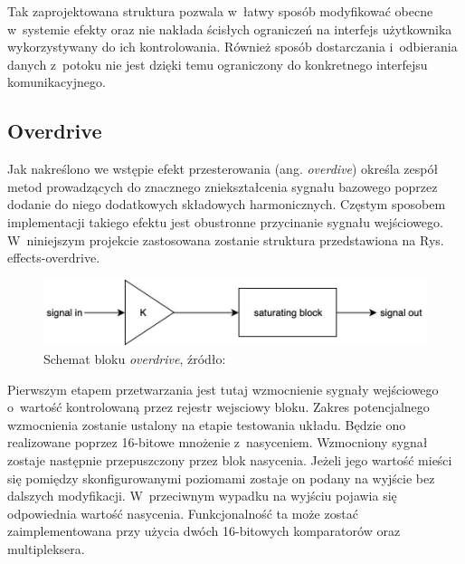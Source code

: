 Tak zaprojektowana struktura pozwala w~łatwy sposób modyfikować obecne w~systemie efekty oraz nie nakłada ścisłych ograniczeń na interfejs użytkownika wykorzystywany do ich kontrolowania. Również sposób dostarczania i~odbierania danych z~potoku nie jest dzięki temu ograniczony do konkretnego interfejsu komunikacyjnego.


\subsection{Overdrive}

Jak nakreślono we wstępie efekt przesterowania (ang. \textit{overdive}) określa zespół metod prowadzących do znacznego zniekształcenia sygnału bazowego poprzez dodanie do niego dodatkowych składowych harmonicznych. Częstym sposobem implementacji takiego efektu jest obustronne przycinanie sygnału wejściowego. W~niniejszym projekcie zastosowana zostanie struktura przedstawiona na Rys. {effects-overdrive}.

\vspace{0.5cm}
\begin{figure}[ht]
    \centering
    \includegraphics[scale=0.4]{img/overdrive.jpg}
    \captionsetup{format=plain,justification=centering}
    \caption{Schemat bloku \textit{overdrive}, źródło: \cite{fpga_pedal}}
    \label{effects-overdrive}
\end{figure}
\vspace{0.5cm}

Pierwszym etapem przetwarzania jest tutaj wzmocnienie sygnały wejściowego o~wartość kontrolowaną przez rejestr wejsciowy bloku. Zakres potencjalnego wzmocnienia zostanie ustalony na etapie testowania układu. Będzie ono realizowane poprzez 16-bitowe mnożenie z~nasyceniem. Wzmocniony sygnał zostaje następnie przepuszczony przez blok nasycenia. Jeżeli jego wartość mieści się pomiędzy skonfigurowanymi poziomami zostaje on podany na wyjście bez dalszych modyfikacji. W~przeciwnym wypadku na wyjściu pojawia się odpowiednia wartość nasycenia. Funkcjonalność ta może zostać zaimplementowana przy użycia dwóch 16-bitowych komparatorów oraz multipleksera.

